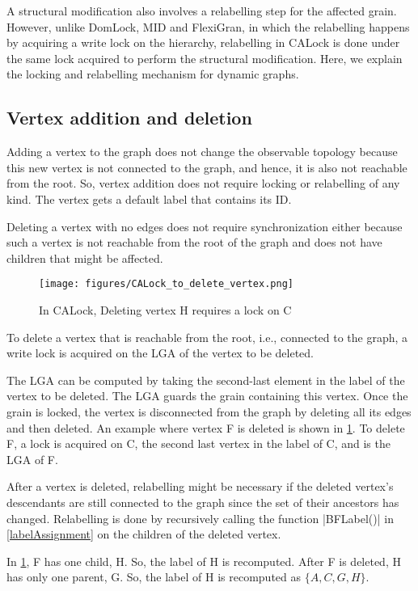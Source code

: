 A structural modification also involves a relabelling step for the affected grain. However, unlike DomLock, MID and FlexiGran, in which the relabelling happens by acquiring a write lock on the hierarchy, relabelling in CALock is done under the same lock acquired to perform the structural modification. 
Here, we explain the locking and relabelling mechanism for dynamic graphs.

\subsection{Vertex addition and deletion}
Adding a vertex to the graph does not change the observable topology because this new vertex is not connected to the graph, and hence, it is also not reachable from the root. 
So, vertex addition does not require locking or relabelling of any kind. The vertex gets a default label that contains its ID. 

Deleting a vertex with no edges does not require synchronization either because such a vertex is not reachable from the root of the graph and does not have children that might be affected.

\begin{figure}[h]
	\centering
	\captionsetup{justification=centering}
	\texttt{[image: figures/CALock\_to\_delete\_vertex.png]}
	\caption{In CALock, Deleting vertex H requires a lock on C}
	\label{fig:calockdelete}
\end{figure}

To delete a vertex that is reachable from the root, i.e., connected to the graph, a write lock is acquired on the LGA of the vertex to be deleted. 

The LGA can be computed by taking the second-last element in the label of the vertex to be deleted. The LGA guards the grain containing this vertex. 
Once the grain is locked, the vertex is disconnected from the graph by deleting all its edges and then deleted. An example where vertex F is deleted is shown in \cref{fig:calockdelete}. To delete F, a lock is acquired on C, the second last vertex in the label of C, and is the LGA of F.

After a vertex is deleted, relabelling might be necessary if the deleted vertex's descendants are still connected to the graph since the set of their ancestors has changed. Relabelling is done by recursively calling the function \inline|BFLabel()| in \cref{labelAssignment} on the children of the deleted vertex. 

In \cref{fig:calockdelete}, F has one child, H. So, the label of H is recomputed. After F is deleted, H has only one parent, G. So, the label of H is recomputed as $\{A, C, G, H\}$.



